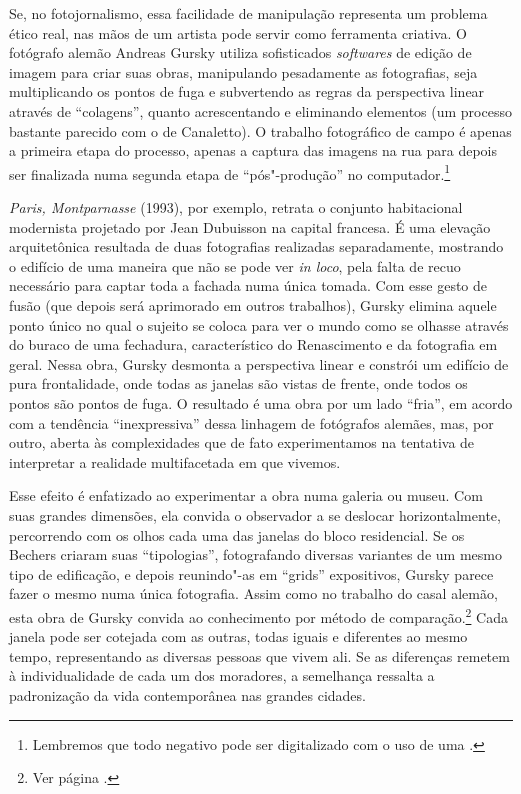 Se, no fotojornalismo, essa facilidade de manipulação representa um
problema ético real, nas mãos de um artista pode servir como ferramenta
criativa. O fotógrafo alemão Andreas Gursky utiliza sofisticados
\emph{softwares} de edição de imagem para criar suas obras, manipulando
pesadamente as fotografias, seja multiplicando os pontos de fuga e
subvertendo as regras da perspectiva linear através de ``colagens'',
quanto acrescentando e eliminando elementos (um processo bastante
parecido com o de Canaletto). O trabalho fotográfico de campo é apenas a
primeira etapa do processo, apenas a captura das imagens na rua para
depois ser finalizada numa segunda etapa de ``pós"-produção'' no
computador.\footnote{Lembremos que todo negativo pode ser digitalizado
  com o uso de uma {}.}

\emph{Paris, Montparnasse} (1993), por exemplo, retrata o conjunto
habitacional modernista projetado por Jean Dubuisson na capital
francesa. É uma elevação arquitetônica resultada de duas fotografias
realizadas separadamente, mostrando o edifício de uma maneira que não se
pode ver \emph{in loco}, pela falta de recuo necessário para captar toda
a fachada numa única tomada. Com esse gesto de fusão (que depois será
aprimorado em outros trabalhos), Gursky elimina aquele ponto único no
qual o sujeito se coloca para ver o mundo como se olhasse através do
buraco de uma fechadura, característico do Renascimento e da fotografia
em geral. Nessa obra, Gursky desmonta a perspectiva linear e constrói um
edifício de pura frontalidade, onde todas as janelas são vistas de
frente, onde todos os pontos são pontos de fuga. O resultado é uma obra
por um lado ``fria'', em acordo com a tendência ``inexpressiva'' dessa
linhagem de fotógrafos alemães, mas, por outro, aberta às complexidades
que de fato experimentamos na tentativa de interpretar a realidade
multifacetada em que vivemos.

Esse efeito é enfatizado ao experimentar a obra numa galeria ou museu.
Com suas grandes dimensões, ela convida o observador a se deslocar
horizontalmente, percorrendo com os olhos cada uma das janelas do bloco
residencial. Se os Bechers criaram suas ``tipologias'', fotografando
diversas variantes de um mesmo tipo de edificação, e depois reunindo"-as
em ``grids'' expositivos, Gursky parece fazer o mesmo numa única
fotografia. Assim como no trabalho do casal alemão, esta obra de Gursky
convida ao conhecimento por método de comparação.\footnote{Ver página
  .} Cada janela pode ser cotejada com as outras, todas iguais e
diferentes ao mesmo tempo, representando as diversas pessoas que vivem
ali. Se as diferenças remetem à individualidade de cada um dos
moradores, a semelhança ressalta a padronização da vida contemporânea
nas grandes cidades.

